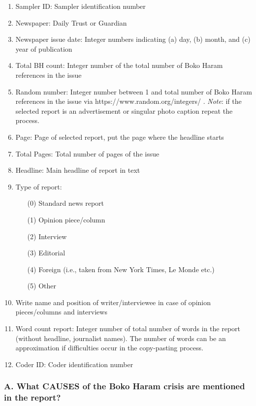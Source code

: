 \begin{enumerate}
    \item Sampler ID: Sampler identification number
    \item Newspaper: Daily Trust or Guardian
    \item Newspaper issue date: Integer numbers indicating (a) day, (b) month, and (c) year of publication
    \item Total BH count: Integer number of the total number of Boko Haram references in the issue
    \item Random number: Integer number between 1 and total number of Boko Haram references in the issue via https://www.random.org/integers/ . \textit{Note}: if the selected report is an advertisement or singular photo caption repeat the process.
    \item Page: Page of selected report, put the page where the headline starts
    \item Total Pages: Total number of pages of the issue
    \item Headline: Main headline of report in text
    \item Type of report:
    \begin{enumerate}
        \item[(0)] Standard news report
        \item[(1)] Opinion piece/column
        \item[(2)] Interview
        \item[(3)] Editorial
        \item[(4)] Foreign (i.e., taken from New York Times, Le Monde etc.)
        \item[(5)] Other
    \end{enumerate}
    \item Write name and position of writer/interviewee in case of opinion pieces/columns and interviews
    \item Word count report: Integer number of total number of words in the report (without headline, journalist names). The number of words can be an approximation if difficulties occur in the copy-pasting process.
    \item Coder ID: Coder identification number
\end{enumerate}

\vspace{3mm}

\subsubsection{A.	What CAUSES of the Boko Haram crisis are mentioned in the report? }

